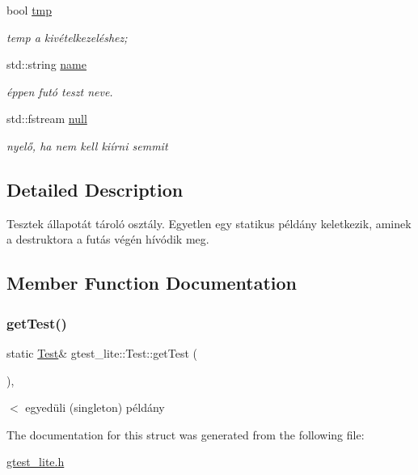 \begin{DoxyCompactItemize}
\mbox{\label{structgtest__lite_1_1_test_a1145ceb335a60a808b7b4d5d1624b2a5}} 
bool \mbox{\hyperlink{structgtest__lite_1_1_test_a1145ceb335a60a808b7b4d5d1624b2a5}{tmp}}
\begin{DoxyCompactList}\small\item\em temp a kivételkezeléshez; \end{DoxyCompactList}\item 
\mbox{\label{structgtest__lite_1_1_test_a8d495a42580e3ae337f9c4982136b700}} 
std\+::string \mbox{\hyperlink{structgtest__lite_1_1_test_a8d495a42580e3ae337f9c4982136b700}{name}}
\begin{DoxyCompactList}\small\item\em éppen futó teszt neve. \end{DoxyCompactList}\item 
\mbox{\label{structgtest__lite_1_1_test_af4784302d78bb004bcb20b7f75ec06c3}} 
std\+::fstream \mbox{\hyperlink{structgtest__lite_1_1_test_af4784302d78bb004bcb20b7f75ec06c3}{null}}
\begin{DoxyCompactList}\small\item\em nyelő, ha nem kell kiírni semmit \end{DoxyCompactList}\end{DoxyCompactItemize}


\subsection{Detailed Description}
Tesztek állapotát tároló osztály. Egyetlen egy statikus példány keletkezik, aminek a destruktora a futás végén hívódik meg. 

\subsection{Member Function Documentation}
\mbox{\label{structgtest__lite_1_1_test_a532aa4c5e33e41ce8139b9c9098aa6f2}} 
\subsubsection{\texorpdfstring{getTest()}{getTest()}}
{\footnotesize\ttfamily static \mbox{\hyperlink{structgtest__lite_1_1_test}{Test}}\& gtest\+\_\+lite\+::\+Test\+::get\+Test (\begin{DoxyParamCaption}{ }\end{DoxyParamCaption})\hspace{0.3cm}{\ttfamily [inline]}, {\ttfamily [static]}}

$<$ egyedüli (singleton) példány 

The documentation for this struct was generated from the following file\+:\begin{DoxyCompactItemize}
\item 
\mbox{\hyperlink{gtest__lite_8h}{gtest\+\_\+lite.\+h}}\end{DoxyCompactItemize}
